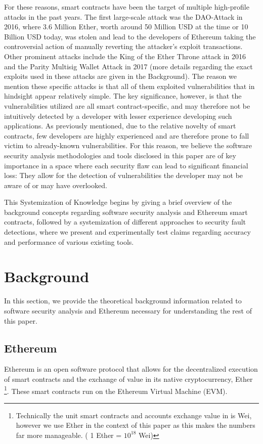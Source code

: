 \documentclass[letterpaper,twocolumn,10pt]{article}
\begin{document}
For these reasons, smart contracts have been the target of multiple high-profile attacks in the past years. The first large-scale attack was the DAO-Attack in 2016, where 3.6 Million Ether, worth around 50 Million USD at the time or 10 Billion USD today,  was stolen and lead to the developers of Ethereum taking the controversial action of manually reverting the attacker's exploit transactions. Other prominent attacks include the King of the Ether Throne attack in 2016 and the Parity Multisig Wallet Attack in 2017 (more details regarding the exact exploits used in these attacks are given in the Background). The reason we mention these specific attacks is that all of them exploited vulnerabilities that in hindsight appear relatively simple. The key significance, however, is that the vulnerabilities utilized are all smart contract-specific, and may therefore not be intuitively detected by a developer with lesser experience developing such applications. As previously mentioned, due to the relative novelty of smart contracts, few developers are highly experienced and are therefore prone to fall victim to already-known vulnerabilities. For this reason, we believe the software security analysis methodologies and tools disclosed in this paper are of key importance in a space where each security flaw can lead to significant financial loss: They allow for the detection of vulnerabilities the developer may not be aware of or may have overlooked. 

This Systemization of Knowledge begins by giving a brief overview of the background concepts regarding software security analysis and Ethereum smart contracts, followed by a systemization of different approaches to security fault detections, where we present and experimentally test claims regarding accuracy and performance of various existing tools. 


\section{Background}
In this section, we provide the theoretical background information related to software security analysis and Ethereum necessary for understanding the rest of this paper.

\subsection{Ethereum}
Ethereum is an open software protocol that allows for the decentralized execution of smart contracts and the exchange of value in its native cryptocurrency, Ether \footnote{Technically the unit smart contracts and accounts exchange value in is Wei, however we use Ether in the context of this paper as this makes the numbers far more manageable. ( 1 Ether = $10^{18}$ Wei) }.  These smart contracts run on the Ethereum Virtual Machine (EVM). 
\end{document}
